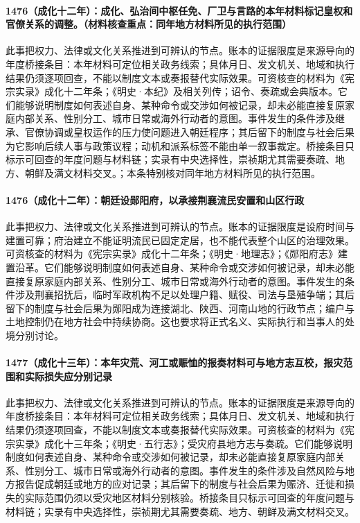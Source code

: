 \paragraph{1476（成化十二年）：成化、弘治间中枢任免、厂卫与言路的本年材料标记皇权和官僚关系的调整。（材料核查重点：同年地方材料所见的执行范围）} 此事把权力、法律或文化关系推进到可辨认的节点。账本的证据限度是来源导向的年度桥接条目：本年材料可定位相关政务线索；具体月日、发文机关、地域和执行结果仍须逐项回查，不能以制度文本或奏报替代实际效果。可资核查的材料为《宪宗实录》成化十二年条；《明史·本纪》及相关列传；诏令、奏疏或会典版本。它们能够说明制度如何表述自身、某种命令或交涉如何被记录，却未必能直接复原家庭内部关系、性别分工、城市日常或海外行动者的意图。事件发生的条件涉及继承、官僚协调或皇权运作的压力使问题进入朝廷程序；其后留下的制度与社会后果为它影响后续人事与政策议程；动机和派系标签不能由单一叙事裁定。桥接条目只标示可回查的年度问题与材料链；实录有中央选择性，崇祯期尤其需要奏疏、地方、朝鲜及满文材料交叉。；本条特别核对同年地方材料所见的执行范围。

\paragraph{1476（成化十二年）：朝廷设郧阳府，以承接荆襄流民安置和山区行政} 此事把权力、法律或文化关系推进到可辨认的节点。账本的证据限度是设府时间与建置可靠；府治建立不能证明流民已固定定居，也不能代表整个山区的治理效果。可资核查的材料为《宪宗实录》成化十二年条；《明史·地理志》；《郧阳府志》建置沿革。它们能够说明制度如何表述自身、某种命令或交涉如何被记录，却未必能直接复原家庭内部关系、性别分工、城市日常或海外行动者的意图。事件发生的条件涉及荆襄招抚后，临时军政机构不足以处理户籍、赋役、司法与垦殖争端；其后留下的制度与社会后果为郧阳成为连接湖北、陕西、河南山地的行政节点；编户与土地控制仍在地方社会中持续协商。这也要求将正式名义、实际执行和当事人的处境分别讨论。

\paragraph{1477（成化十三年）：本年灾荒、河工或赈恤的报奏材料可与地方志互校，报灾范围和实际损失应分别记录} 此事把权力、法律或文化关系推进到可辨认的节点。账本的证据限度是来源导向的年度桥接条目：本年材料可定位相关政务线索；具体月日、发文机关、地域和执行结果仍须逐项回查，不能以制度文本或奏报替代实际效果。可资核查的材料为《宪宗实录》成化十三年条；《明史·五行志》；受灾府县地方志与奏疏。它们能够说明制度如何表述自身、某种命令或交涉如何被记录，却未必能直接复原家庭内部关系、性别分工、城市日常或海外行动者的意图。事件发生的条件涉及自然风险与地方报告促成朝廷或地方的应对记录；其后留下的制度与社会后果为赈济、迁徙和损失的实际范围仍须以受灾地区材料分别核验。桥接条目只标示可回查的年度问题与材料链；实录有中央选择性，崇祯期尤其需要奏疏、地方、朝鲜及满文材料交叉。

